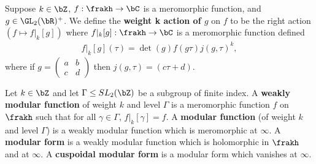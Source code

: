 \begin{lem}\label{lem:weight-k-action-on-mero-func}
	Suppose $k \in \bZ$, $f:\frakh \to \bC$ is a meromorphic function, and $g \in \GL_2(\bR)^+$. We define the \textbf{weight k action of $g$} on $f$ to be the right action $\left(f \mapsto f|_k[g]\right)$ where $f|_k[g]:\frakh \to \bC$ is a meromorphic function defined
	\begin{align*}
		f |_k[g](\tau) = \det(g) f(g\tau)j(g,\tau)^k,
	\end{align*}
	where if $g = \begin{pmatrix}a & b \\ c & d\end{pmatrix}$ then $j(g,\tau) = (c\tau + d)$.
\end{lem}

\begin{defn}\label{defn:weakly-mod-func-to-mod-forms}
	Let $k \in \bZ$ and let $\Gamma \leq SL_2(\bZ)$ be a subgroup of finite index. A \textbf{weakly modular function} of weight $k$ and level $\Gamma$ is a meromorphic function $f$ on $\frakh$ such that for all  $\gamma \in \Gamma$, $f|_k[\gamma] = f$. A \textbf{modular function} (of weight $k$ and level $\Gamma$) is a weakly modular function which is meromorphic at $\infty$. A \textbf{modular form} is a weakly modular function which is holomorphic in $\frakh$ and at $\infty$. A \textbf{cuspoidal modular form} is a modular form which vanishes at $\infty$. 
\end{defn}

